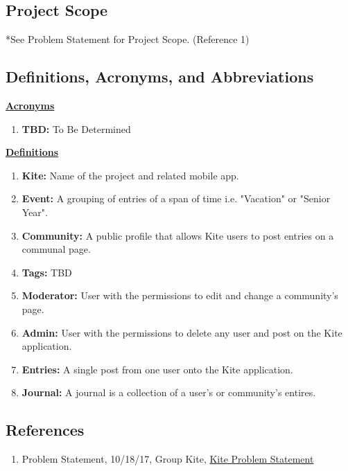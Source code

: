 \documentclass[letterpaper, 10, draftclsnofoot, onecolumn]{IEEEtran}
\begin{document}
\subsection{Project Scope}
 *See Problem Statement for Project Scope. (Reference 1)

\subsection{Definitions, Acronyms, and Abbreviations}
\underline{\textbf{Acronyms}}
\begin{enumerate}
\item \textbf{TBD: } To Be Determined 
\end{enumerate}

\underline{\textbf{Definitions}}
\begin{enumerate}
\item \textbf{Kite: } Name of the project and related mobile app.
\item \textbf{Event: } A grouping of entries of a span of time i.e. "Vacation" or "Senior Year".
\item \textbf{Community: } A public profile that allows Kite users to post entries on a communal page.
\item \textbf{Tags: } TBD
\item \textbf{Moderator: } User with the permissions to edit and change a community's page.
\item \textbf{Admin: } User with the permissions to delete any user and post on the Kite application.
\item \textbf{Entries: } A single post from one user onto the Kite application.
\item \textbf{Journal: } A journal is a collection of a user's or community's entires.
\end{enumerate}


\subsection{References}
\begin{enumerate}
\item Problem Statement, 10/18/17, Group Kite, \href{https://github.com/TheEnderPrime/Capstone/tree/master/Documentation/Problem\%20Statement}{Kite Problem Statement}
\end{enumerate}

 
\end{document}
